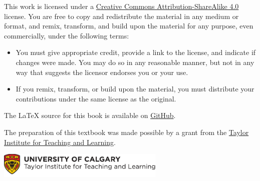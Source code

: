 \bigskip

\noindent \footnotesize This work is licensed under a \href{https://creativecommons.org/licenses/by-sa/4.0/}{Creative Commons Attribution-ShareAlike 4.0} license. 
You are free to copy and redistribute the material in any medium or format, and  remix, transform, and build upon the material for any purpose, even commercially, under the following terms:
\begin{itemize}
\item You must give appropriate credit, provide a link to the license, and indicate if changes were made. You may do so in any reasonable manner, but not in any way that suggests the licensor endorses you or your use.
\item If you remix, transform, or build upon the material, you must distribute your contributions under the same license as the original.
\end{itemize}

\vfil\normalsize\noindent
The \LaTeX{} source for this book is available on \href{https://github.com/rzach/forallx-yyc/}{GitHub}.

\bigskip
\noindent The preparation of this textbook was made possible by a grant from the \href{http://www.ucalgary.ca/taylorinstitute/}{Taylor Institute for Teaching and Learning}.

\bigskip
\noindent
\href{http://www.ucalgary.ca/taylorinstitute/}{\includegraphics[width=8cm]{assets/ti-color}}
\normalsize 
